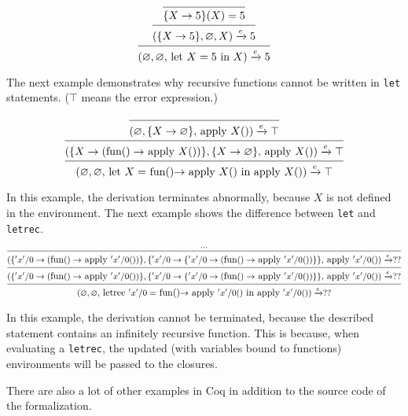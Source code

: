 \documentclass[12pt]{article}
\theoremstyle{definition}
\newcommand{\ose}{\xrightarrow{e}}
\numberwithin{equation}{section}
\begin{document}
\begin{equation}
\nonumber
	\begin{prooftree}
		\infer0{\{X \rightarrow 5\}(X) = 5}
		\infer1{(\{X \rightarrow 5\}, \varnothing, X) \ose 5}
		\infer1{(\varnothing, \varnothing,$ let $ X = 5$ in $X) \ose 5}
	\end{prooftree}
\end{equation}

The next example demonstrates why recursive functions cannot be written in \verb|let| statements. ($\top$ means the error expression.)

\begin{equation}
\nonumber
	\begin{prooftree}
		\infer0{(\varnothing, \{X \rightarrow \varnothing\}, $ apply $X()) \ose \top}
		\infer1{(\{X \rightarrow ($fun$() \rightarrow$ apply $X())\},\{X \rightarrow \varnothing\},$ apply $X()) \ose \top}
		\infer1{(\varnothing, \varnothing, $ let $X =$ fun()$ \rightarrow $ apply $X()$ in apply $ X()) \ose \top}
	\end{prooftree}
\end{equation}

In this example, the derivation terminates abnormally, because $X$ is not defined in the environment. The next example shows the difference between \verb|let| and \verb|letrec|.

\begin{equation}
\nonumber
\fontsize{9}{12}
	\begin{prooftree}
		\hypo{...}
		\infer1{(\{'x'/0 \rightarrow ($fun$() \rightarrow$ apply $'x'/0())\}, \{'x'/0 \rightarrow \{'x'/0 \rightarrow ($fun$() \rightarrow$ apply $'x'/0())\}\}, $ apply $'x'/0()) \ose ??}
		\infer1{(\{'x'/0 \rightarrow ($fun$() \rightarrow$ apply $'x'/0())\},\{'x'/0 \rightarrow \{'x'/0 \rightarrow ($fun$() \rightarrow$ apply $'x'/0())\}\},$ apply $'x'/0()) \ose ??}
		\infer1{(\varnothing, \varnothing, $ letrec $'x'/0 =$ fun()$ \rightarrow $ apply $'x'/0()$ in apply $ 'x'/0()) \ose ??}
	\end{prooftree}
\end{equation}

In this example, the derivation cannot be terminated, because the described statement contains an infinitely recursive function. This is because, when evaluating a \verb|letrec|, the updated (with variables bound to functions) environments will be passed to the closures.

There are also a lot of other examples in Coq in addition to the source code of the formalization.
\end{document}
